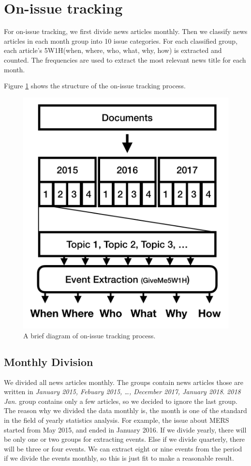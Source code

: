 \section{On-issue tracking}

For on-issue tracking, we first divide news articles monthly.
Then we classify news articles in each month group into 10 issue categories.
For each classified group, each article’s 5W1H(when, where, who, what, why, how) is extracted and counted.
The frequencies are used to extract the most relevant news title for each month.

Figure \ref{fig:onissuedia} shows the structure of the on-issue tracking process.

\begin{figure}[!htbp]
  \centering
  \includegraphics[width=0.8\linewidth]{on_issue_1.png}
  \caption{A brief diagram of on-issue tracking process.}
  \label{fig:onissuedia}
\end{figure}

\subsection{Monthly Division}

We divided all news articles monthly.
The groups contain news articles those are written in \textit{January 2015, Febuary 2015, \dots, December 2017, January 2018}.
\textit{2018 Jan.} group contains only a few articles,
so we decided to ignore the last group.
The reason why we divided the data monthly is, the month is one of the standard in the field of yearly statistics analysis.
For example, the issue about MERS started from May 2015, and ended in January 2016.
If we divide yearly, there will be only one or two groups for extracting events.
Else if we divide quarterly, there will be three or four events.
We can extract eight or nine events from the period if we divide the events monthly,
so this is just fit to make a reasonable result.

